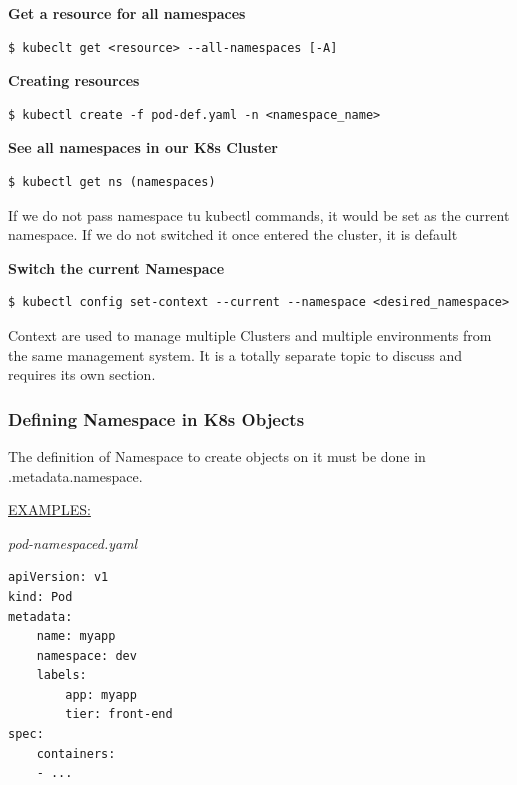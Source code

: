 \documentclass{article}
\newenvironment{blocktemplateI}[1]{%
    \tcolorbox[beamer,%
    noparskip,breakable,
    colframe=Violet,%
    colbacklower=Black,%
    title=#1]}%
    {\endtcolorbox}
\newenvironment{blocktemplateIII}[1]{%
    \tcolorbox[beamer,%
    noparskip,breakable,
    ,colframe=Red,%
    colbacklower=LimeGreen!75!LightGreen,%
    title=#1]}%
    {\endtcolorbox}
\newenvironment{codetemplate}[1][]{%
  \mybasecolorbox[#1]
  \itshape
}{%
  \endmybasecolorbox
}
\begin{document}
\textbf{Get a resource for all namespaces}
\begin{codetemplate}{}
\begin{verbatim}
$ kubeclt get <resource> --all-namespaces [-A]
\end{verbatim}
\end{codetemplate}

\textbf{Creating resources}
\begin{codetemplate}{}
\begin{verbatim}
$ kubectl create -f pod-def.yaml -n <namespace_name>
\end{verbatim}
\end{codetemplate}

\textbf{See all namespaces in our K8s Cluster}
\begin{codetemplate}{}
\begin{verbatim}
$ kubectl get ns (namespaces)
\end{verbatim}
\end{codetemplate}

\begin{blocktemplateIII}{WARNING}
If we do not pass namespace tu kubectl commands, it would be set as the current namespace. If we do not switched it once entered the cluster, it is default
\end{blocktemplateIII}

\textbf{Switch the current Namespace}
\begin{codetemplate}{}
\begin{verbatim}
$ kubectl config set-context --current --namespace <desired_namespace>
\end{verbatim}
\end{codetemplate}

\begin{blocktemplateI}{NOTE}
Context are used to manage multiple Clusters and multiple environments from the same management system. It is a totally separate topic to discuss and requires its own section.
\end{blocktemplateI}

\subsubsection{Defining Namespace in K8s Objects}

The definition of Namespace to create objects on it must be done in .metadata.namespace.

\underline{EXAMPLES:}

\begin{codetemplate}{pod-namespaced.yaml}
\begin{verbatim}
apiVersion: v1
kind: Pod
metadata:
    name: myapp
    namespace: dev
    labels:
        app: myapp
        tier: front-end
spec:
    containers:
    - ...
\end{verbatim}
\end{codetemplate}
\end{document}
